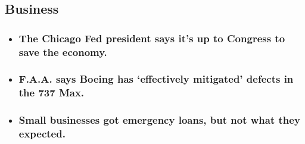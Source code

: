 \begin{itemize}
  \hypertarget{business}{%
  \subsection{Business}\label{business}}

  \begin{itemize}
  \item
    \href{https://www.nytimes3xbfgragh.onion/live/2020/08/03/business/stock-market-today-coronavirus?type=styln-live-updates\&label=business\&index=1\#the-chicago-fed-president-says-its-up-to-congress-to-save-the-economy}{}

    \hypertarget{the-chicago-fed-president-says-its-up-to-congress-to-save-the-economy}{%
    \subsubsection{The Chicago Fed president says it's up to Congress to
    save the
    economy.}\label{the-chicago-fed-president-says-its-up-to-congress-to-save-the-economy}}
  \item
    \href{https://www.nytimes3xbfgragh.onion/live/2020/08/03/business/stock-market-today-coronavirus?type=styln-live-updates\&label=business\&index=1\#faa-says-boeing-has-effectively-mitigated-defects-in-the-737-max}{}

    \hypertarget{faa-says-boeing-has-effectively-mitigated-defects-in-the-737-max}{%
    \subsubsection{F.A.A. says Boeing has `effectively mitigated'
    defects in the 737
    Max.}\label{faa-says-boeing-has-effectively-mitigated-defects-in-the-737-max}}
  \item
    \href{https://www.nytimes3xbfgragh.onion/live/2020/08/03/business/stock-market-today-coronavirus?type=styln-live-updates\&label=business\&index=1\#small-businesses-got-emergency-loans-but-not-what-they-expected}{}

    \hypertarget{small-businesses-got-emergency-loans-but-not-what-they-expected}{%
    \subsubsection{Small businesses got emergency loans, but not what
    they
    expected.}\label{small-businesses-got-emergency-loans-but-not-what-they-expected}}
  \end{itemize}
\end{itemize}

